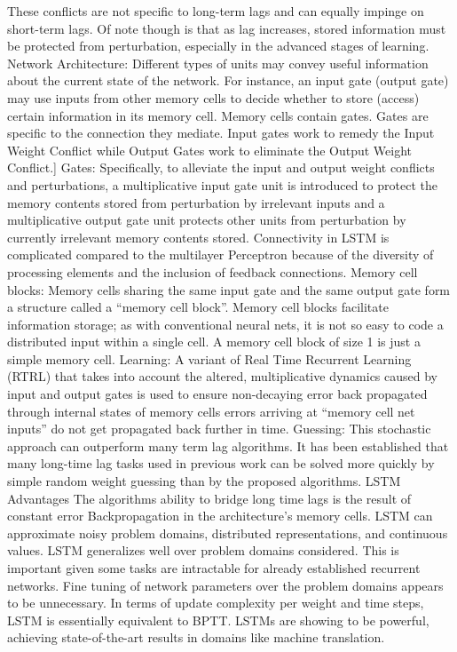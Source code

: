 These conflicts are not specific to long-term lags and can equally impinge on short-term lags. Of note though is that as lag increases, stored information must be protected from perturbation, especially in the advanced stages of learning.
Network Architecture: Different types of units may convey useful information about the current state of the network. For instance, an input gate (output gate) may use inputs from other memory cells to decide whether to store (access) certain information in its memory cell.
Memory cells contain gates. Gates are specific to the connection they mediate. Input gates work to remedy the Input Weight Conflict while Output Gates work to eliminate the Output Weight Conflict.]
Gates: Specifically, to alleviate the input and output weight conflicts and perturbations, a multiplicative input gate unit is introduced to protect the memory contents stored from perturbation by irrelevant inputs and a multiplicative output gate unit protects other units from perturbation by currently irrelevant memory contents stored.
Connectivity in LSTM is complicated compared to the multilayer Perceptron because of the diversity of processing elements and the inclusion of feedback connections.
Memory cell blocks: Memory cells sharing the same input gate and the same output gate form a structure called a “memory cell block”.
Memory cell blocks facilitate information storage; as with conventional neural nets, it is not so easy to code a distributed input within a single cell. A memory cell block of size 1 is just a simple memory cell.
Learning: A variant of Real Time Recurrent Learning (RTRL) that takes into account the altered, multiplicative dynamics caused by input and output gates is used to ensure non-decaying error back propagated through internal states of memory cells errors arriving at “memory cell net inputs” do not get propagated back further in time.
Guessing: This stochastic approach can outperform many term lag algorithms. It has been established that many long-time lag tasks used in previous work can be solved more quickly by simple random weight guessing than by the proposed algorithms.
LSTM Advantages
The algorithms ability to bridge long time lags is the result of constant error Backpropagation in the architecture’s memory cells.
LSTM can approximate noisy problem domains, distributed representations, and continuous values.
LSTM generalizes well over problem domains considered. This is important given some tasks are intractable for already established recurrent networks.
Fine tuning of network parameters over the problem domains appears to be unnecessary.
In terms of update complexity per weight and time steps, LSTM is essentially equivalent to BPTT.
LSTMs are showing to be powerful, achieving state-of-the-art results in domains like machine translation.
 
